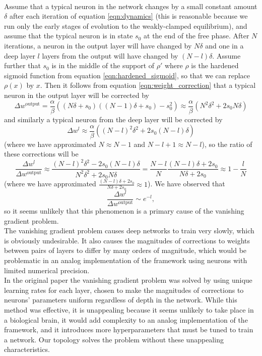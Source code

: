 \documentclass{article}
\newcommand{\npar}{\\\indent}
\begin{document}
\npar
Assume that a typical neuron in the network changes by a small constant amount $\delta$ after each iteration of equation \ref{eqn:dynamics} (this is reasonable because we run only the early stages of evolution to the weakly-clamped equilibrium), and assume that the typical neuron is in state $s_0$ at the end of the free phase. After $N$ iterations, a neuron in the output layer will have changed by $N\delta$ and one in a deep layer $l$ layers from the output will have changed by $(N-l)\delta$. Assume further that $s_0$ is in the middle of the support of $\rho'$ where $\rho$ is the hardened sigmoid function from equation \ref{eqn:hardened_sigmoid}, so that we can replace $\rho(x)$ by $x$. Then it follows from equation \ref{eqn:weight_correction} that a typical neuron in the output layer will be corrected by 
\begin{equation}
\Delta w^\text{output}=\frac{\alpha}{\beta}((N\delta + s_0)((N-1)\delta + s_0)-s_0^2)\approx \frac{\alpha}{\beta}(N^2\delta^2+2s_0N\delta)
\end{equation}
and similarly a typical neuron from the deep layer will be corrected by 
\begin{equation}
\Delta w^l\approx \frac{\alpha}{\beta}((N-l)^2\delta^2+2s_0(N-l)\delta)
\end{equation}
(where we have approximated $N\approx N-1$ and $N-l+1\approx N-l$), so the ratio of these corrections will be
\begin{equation}
\frac{\Delta w^l}{\Delta w^{\text{output}}}\approx \frac{(N-l)^2\delta^2-2s_0(N-l)\delta}{N^2\delta^2+2s_0N\delta}=\frac{N-l}{N}\frac{(N-l)\delta+2s_0}{N\delta+2s_0}\approx 1-\frac{l}{N}
\end{equation}
(where we have approximated $\frac{(N-l)\delta +2s_0}{N\delta+2s_0}\approx 1$). We have observed that
\begin{equation}
\frac{\Delta w^l}{\Delta w^{\text{output}}}\sim e^{-l},
\end{equation}
so it seems unlikely that this phenomenon is a primary cause of the vanishing gradient problem.
\npar
The vanishing gradient problem causes deep networks to train very slowly, which is obviously undesirable. It also causes the magnitudes of corrections to weights between pairs of layers to differ by many orders of magnitude, which would be problematic in an analog implementation of the framework using neurons with limited numerical precision.
\npar
In the original paper the vanishing gradient problem was solved by using unique learning rates for each layer, chosen to make the magnitudes of corrections to neurons' parameters uniform regardless of depth in the network. While this method was effective, it is unappealing because it seems unlikely to take place in a biological brain, it would add complexity to an analog implementation of the framework, and it introduces more hyperparameters that must be tuned to train a network. Our topology solves the problem without these unappealing characteristics.
\end{document}
